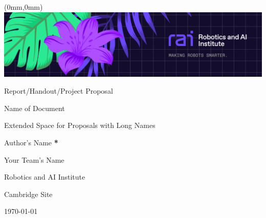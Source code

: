 \documentclass[../bdaii-sample-handout.tex]{subfiles}
\begin{document}
\begin{titlepage}
\begin{textblock*}{\paperwidth}(0mm,0mm)
    \noindent
    \includegraphics[width=\paperwidth]{graphics/_rai-LinkedIn-banner-employees.png}
\end{textblock*}
\makeatletter
\renewcommand{\thefootnote}{\@fnsymbol\c@footnote}
\makeatother
\setlength{\parindent}{0pt}

\null
\vspace{20em}
{\large Report/Handout/Project Proposal\par}
\vspace{\baselineskip}
{\LARGE Name of Document \par}
{\Large Extended Space for Proposals with Long Names \par}
\vspace{2\baselineskip}

{\large Author's Name \textbf{*}\par} 
{{Your Team's Name} \par}
\vspace{\baselineskip}

\vspace{12\baselineskip}
{{Robotics and AI Institute} \par} 
{{Cambridge Site} \par} 
\today\par
{}

\end{titlepage}
\end{document}

